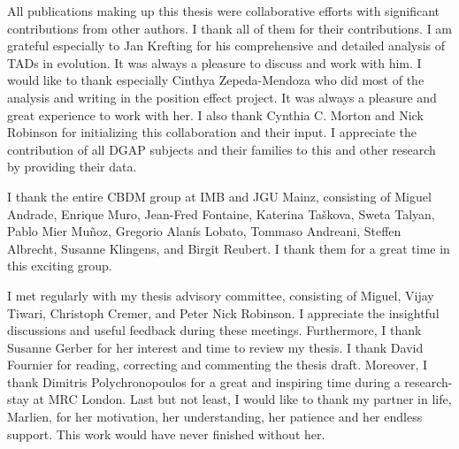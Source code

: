 \documentclass[a4paper,twoside=true,openright,parskip=full,chapterprefix=true,11pt,headings=normal,bibliography=totoc,listof=totoc,titlepage=on,captions=tableabove,draft=false]{scrreprt}
\theoremstyle{definition}
\theoremstyle{definition}
\theoremstyle{definition}
\theoremstyle{remark}
\begin{document}
All publications making up this thesis were collaborative efforts with
significant contributions from other authors. I thank all of them for
their contributions. I am grateful especially to Jan Krefting for his
comprehensive and detailed analysis of TADs in evolution. It was always
a pleasure to discuss and work with him. I would like to thank
especially Cinthya Zepeda-Mendoza who did most of the analysis and
writing in the position effect project. It was always a pleasure and
great experience to work with her. I also thank Cynthia C. Morton and
Nick Robinson for initializing this collaboration and their input. I
appreciate the contribution of all DGAP subjects and their families to
this and other research by providing their data.

I thank the entire CBDM group at IMB and JGU Mainz, consisting of Miguel
Andrade, Enrique Muro, Jean-Fred Fontaine, Katerina Taškova, Sweta
Talyan, Pablo Mier Muñoz, Gregorio Alanís Lobato, Tommaso Andreani,
Steffen Albrecht, Susanne Klingens, and Birgit Reubert. I thank them for
a great time in this exciting group.

I met regularly with my thesis advisory committee, consisting of Miguel,
Vijay Tiwari, Christoph Cremer, and Peter Nick Robinson. I appreciate
the insightful discussions and useful feedback during these meetings.
Furthermore, I thank Susanne Gerber for her interest and time to review
my thesis. I thank David Fournier for reading, correcting and commenting
the thesis draft. Moreover, I thank Dimitris Polychronopoulos for a
great and inspiring time during a research-stay at MRC London. Last but
not least, I would like to thank my partner in life, Marlien, for her
motivation, her understanding, her patience and her endless support.
This work would have never finished without her.





% 
\end{document}

